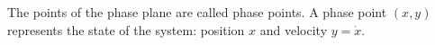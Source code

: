 The points of the phase plane are called phase points. A phase point $(x, y)$ represents the state of the system: position $x$ and velocity $y = \dot{x}$.

